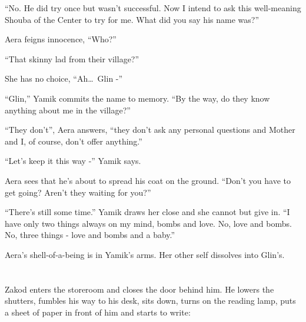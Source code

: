 \documentclass[twoside,11pt]{book}
\begin{document}
``No. He did try once but wasn't successful. Now I intend to ask this well-meaning Shouba of the Center to try for me.
What did you say his name was?''

Aera feigns innocence, ``Who?''

``That skinny lad from their village?''

She has no choice, ``Ah\dots\ Glin -''

``Glin,'' Yamik commits the name to memory. ``By the way, do they know anything about me in the
village?''

``They don't'', Aera answers, ``they don't ask any personal questions and Mother
and I, of course, don't offer anything.''

``Let's keep it this way -'' Yamik says.

Aera sees that he's about to spread his coat on the ground. ``Don't you have to get going? Aren't they waiting for
you?''

``There's still some time.'' Yamik draws her close and she cannot but give in. ``I have only two things always on my
mind, bombs and love. No, love and bombs. No, three things - love and bombs and a baby.''

Aera's shell-of-a-being is in Yamik's arms. Her other self dissolves into Glin's.

\chapter{}

Zakod enters the storeroom and closes the door behind him. He lowers the shutters, fumbles his way to his desk, sits
down, turns on the reading lamp, puts a sheet of paper in front of him and starts to write:
\end{document}
